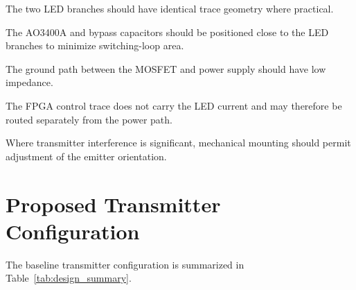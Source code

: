 \documentclass[a4paper,12pt]{article}
\begin{document}
The two LED branches should have identical trace geometry where
practical.

The AO3400A and bypass capacitors should be positioned close to the LED
branches to minimize switching-loop area.

The ground path between the MOSFET and power supply should have low
impedance.

The FPGA control trace does not carry the LED current and may therefore
be routed separately from the power path.

Where transmitter interference is significant, mechanical mounting
should permit adjustment of the emitter orientation.



\section{Proposed Transmitter Configuration}

The baseline transmitter configuration is summarized in
Table~\ref{tab:design_summary}.
\end{document}
